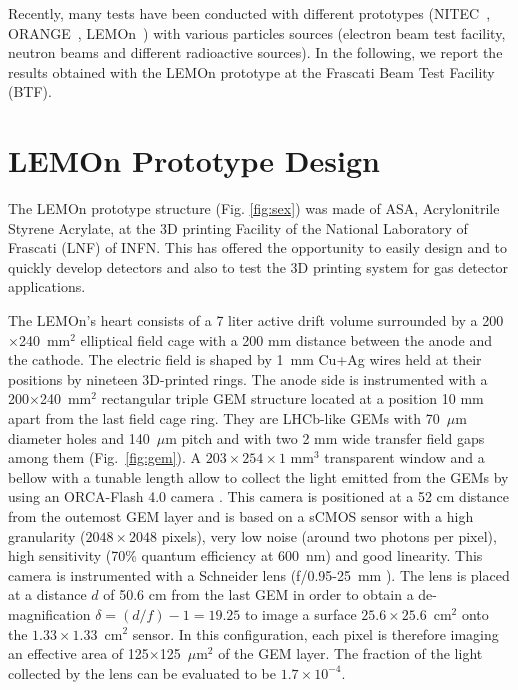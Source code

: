 \documentclass[%
 aip,
 amsmath,amssymb,
 reprint,%
]{revtex4-1}
\begin{document}
Recently, many  tests have been conducted  with different prototypes (NITEC~\cite{JINST:nitec}, ORANGE~\cite{NIM:Marafinietal, bib:jinst_orange2}, LEMOn~\cite{bib:eps, bib:ieee17, bib:elba}) with various particles sources (electron beam test facility, neutron beams and  different radioactive sources). In the following, we report the results obtained with the LEMOn prototype at the Frascati Beam Test Facility (BTF).


\section{LEMOn Prototype Design}

The LEMOn prototype structure (Fig. \ref{fig:sex}) was made of  ASA, Acrylonitrile Styrene Acrylate, at the 3D printing Facility of the National Laboratory of Frascati (LNF)\cite{3dprinting} of INFN. This has offered the opportunity  to easily design and to quickly develop detectors and also to test the 3D printing system for gas detector applications.


The LEMOn's heart consists of a 7 liter active drift volume surrounded by a  200$\times$240~mm$^2$ elliptical field cage with a 200 mm distance between the anode and the cathode. The electric field is  shaped by  1~mm Cu+Ag wires held at their positions  by nineteen 3D-printed rings. The anode side is instrumented with a 200$\times$240~mm$^2$ rectangular triple  GEM structure located at a position 10 mm apart from the last field cage ring. They are LHCb-like \cite{bib:thesis}  GEMs  with 70~$\mu$m diameter holes and 140~$\mu$m pitch   and  with two 2 mm wide  transfer  field gaps among them (Fig.~\ref{fig:gem}).  A $203\times254\times1$ mm$^3$ transparent window 
and a  bellow with a tunable length allow  to collect the light emitted from the GEMs by using an ORCA-Flash 4.0 camera \cite{ORCAcamera}. This camera is positioned  at a 52 cm  distance from the outemost  GEM layer and is based on a sCMOS sensor with a high granularity ($2048\times2048$ pixels), very low noise (around two photons per pixel), high sensitivity (70\%  quantum efficiency at  600~nm) and good linearity. This camera is instrumented with a Schneider lens (f/0.95-25~mm ). The lens is placed at a distance $d$ of 50.6 cm from the last GEM
in order to obtain a de-magnification
$\delta = (d/f) - 1 = 19.25$ to
image a surface $25.6 \times 25.6$~cm$^2$ onto the
$1.33 \times 1.33$~cm$^2$ sensor.
In this configuration, each pixel
 is therefore imaging  an effective area of 125$\times$125~$\mu$m$^2$ of the GEM layer. The fraction of the light collected by the lens can be evaluated \cite{bib:jinst_orange1} to be $1.7 \times 10^{-4}$.
\end{document}
